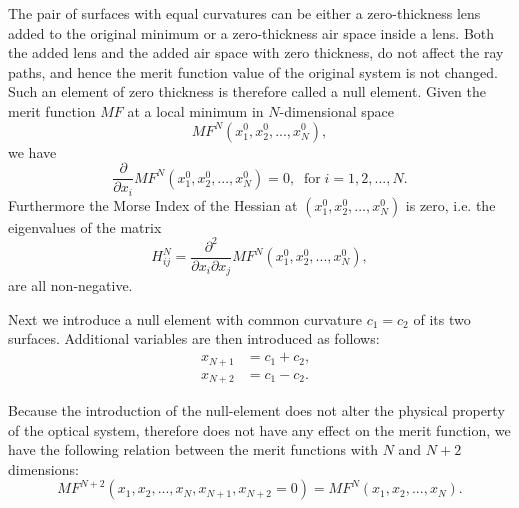 The pair of surfaces with equal curvatures can be either a zero-thickness lens added to the original minimum or a zero-thickness air space inside a lens. Both the added lens and the added air space with zero thickness, do not affect the ray paths, and hence the merit function value of the original system is not changed. Such an element of zero thickness is therefore called a null element. 
Given the merit function $MF$ at a local minimum in $N$-dimensional space
\begin{equation}
MF^{N}(x^{0}_1, x^{0}_{2},...,x^{0}_{N}),
\end{equation}we have 
\begin{equation}\label{eq_mflm}
\frac{\partial}{\partial{x_i}}MF^{N}(x^{0}_1, x^{0}_{2},...,x^{0}_{N}) = 0, \;\; \text{for} \; i =1,2,...,N.
\end{equation}Furthermore the Morse Index of the Hessian at $(x^{0}_1, x^{0}_{2},...,x^{0}_{N})$ is zero, i.e. the eigenvalues of the matrix
\begin{equation}
H^{N}_{ij}=\frac{\partial^2}{\partial{x_i}\partial{x_j}} MF^{N}(x^{0}_1, x^{0}_{2},...,x^{0}_{N}),
\end{equation}are all non-negative.

Next we introduce a null element with common curvature $c_1=c_2$ of its two surfaces. Additional variables are then introduced as follows:
\begin{equation}
\begin{split}
x_{N+1} &= c_1 + c_2, \;\;\\
x_{N+2} &= c_1 - c_2. \;\;
\end{split}
\end{equation}

Because the introduction of the null-element does not alter the physical property of the optical system, therefore does not have any effect on the merit function, we have the following relation between the merit functions with $N$ and $N+2$ dimensions:
\begin{equation} \label{eq_mfconst}
MF^{N+2}(x_1, x_{2},...,x_{N}, x_{N+1},x_{N+2}=0) = MF^{N}(x_1, x_{2},...,x_{N}).
\end{equation}%

